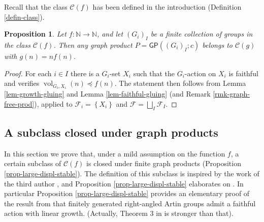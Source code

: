 \documentclass[11pt]{amsart}
\newcommand{\N}{\ensuremath{\mathbb{N}}}%
\newcommand{\F}{\ensuremath{\mathcal{F}}}%
\newcommand{\vol}{\ensuremath{\operatorname{vol}}}%
\newcommand{\Class}{\ensuremath{\mathcal{C}}}
\theoremstyle{definition}
\theoremstyle{plain}
\newtheorem{prop}[defin]{Proposition}
\newtheorem{lem}[defin]{Lemma}
\theoremstyle{remark}
\begin{document}
%


Recall that the class $\Class(f)$ has been defined in the introduction (Definition \ref{defin-class}). 

\begin{prop} \label{prop-largebound-graph-prod}
	Let $f \colon \N\to \N$, and let $(G_i)_I$ be a finite collection of groups in the class $\Class(f)$. Then any graph product $P = \mathsf{GP}((G_i)_{I}; c)$ belongs to $\Class(g)$ with $g(n) = n f(n)$.
\end{prop}

\begin{proof}
For each $i \in I$ there is a $G_i$-set $X_i$ such that the $G_i$-action on $X_i$ is faithful and verifies $\vol_{G_i, X_i}(n) \preccurlyeq f(n)$. The statement then follows from Lemma \ref{lem-growth-gluing} and Lemma \ref{lem-faithful-gluing} (and Remark \ref{rmk-graph-free-prod}), applied to  $\F_i = \left\lbrace X_i \right\rbrace $ and $\F =  \bigsqcup_I \F_I$.
\end{proof}

\subsection{A subclass closed under graph products} \label{subsec-subclass-stable}

In this section we prove that, under a mild assumption on the function $f$, a certain subclass of $\Class(f)$ is closed under finite graph products (Proposition \ref{prop-large-displ-stable}). The definition of this subclass is inspired by the work of the third author \cite{Salo-graph-prod}, and Proposition \ref{prop-large-displ-stable} elaborates on \cite[Theorem 3]{Salo-graph-prod}. In particular Proposition \ref{prop-large-displ-stable} provides an elementary proof of the result from \cite{Salo-graph-prod} that finitely generated right-angled Artin groups admit a faithful action with linear growth. (Actually, Theorem 3 in \cite{Salo-graph-prod} is stronger than that).
\end{document}
